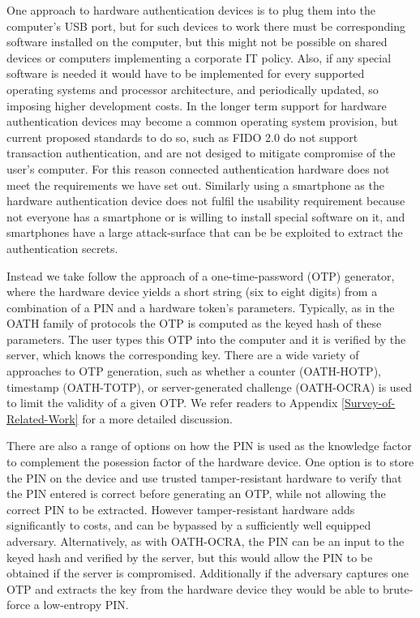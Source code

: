 One approach to hardware authentication devices is to plug them into the computer's USB port, but for such devices to work there must be corresponding software installed on the computer, but this might not be possible on shared devices or computers implementing a corporate IT policy.
Also, if any special software is needed it would have to be implemented for every supported operating systems and processor architecture, and periodically updated, so imposing higher development costs.
In the longer term support for hardware authentication devices may become a common operating system provision, but current proposed standards to do so, such as FIDO 2.0 do not support transaction authentication, and are not desiged to mitigate compromise of the user's computer.
For this reason connected authentication hardware does not meet the requirements we have set out.
Similarly using a smartphone as the hardware authentication device does not fulfil the usability requirement because not everyone has a smartphone or is willing to install special software on it, and smartphones have a large attack-surface that can be be exploited to extract the authentication secrets.

Instead we take follow the approach of a one-time-password (OTP) generator, where the hardware device yields a short string (\eg six to eight digits) from a combination of a PIN and a hardware token's parameters. Typically, as in the OATH family of protocols the OTP is computed as the keyed hash of these parameters. The user types this OTP into the computer and it is verified by the server, which knows the corresponding key. There are a wide variety of approaches to OTP generation, such as whether a counter (\eg OATH-HOTP), timestamp (\eg OATH-TOTP), or server-generated challenge (\eg OATH-OCRA) is used to limit the validity of a given OTP.  We refer readers to Appendix \ref{Survey-of-Related-Work} for a more detailed discussion.

There are also a range of options on how the PIN is used as the knowledge factor to complement the posession factor of the hardware device.
One option is to store the PIN on the device and use trusted tamper-resistant hardware to verify that the PIN entered is correct before generating an OTP, while not allowing the correct PIN to be extracted.
However tamper-resistant hardware adds significantly to costs, and can be bypassed by a sufficiently well equipped adversary.
Alternatively, as with OATH-OCRA, the PIN can be an input to the keyed hash and verified by the server, but this would allow the PIN to be obtained if the server is compromised.
Additionally if the adversary captures one OTP and extracts the key from the hardware device they would be able to brute-force a low-entropy PIN.

